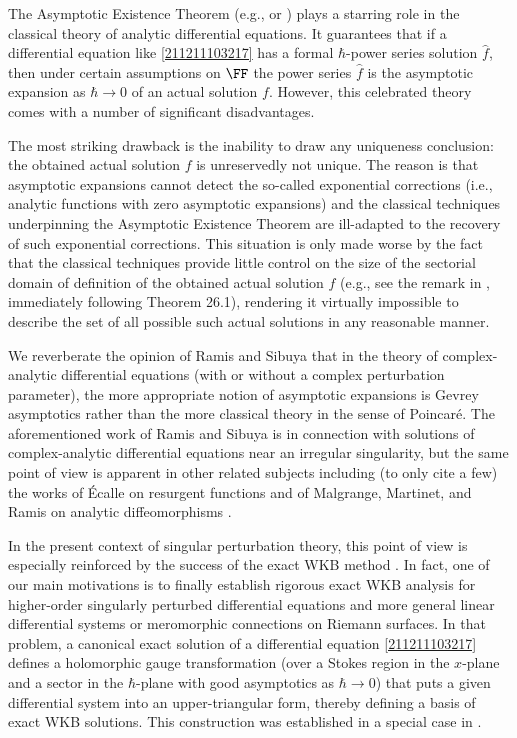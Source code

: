 \documentclass[11pt]{article}
\begin{document}
The Asymptotic Existence Theorem (e.g., \cite[Theorem 26.1]{MR0460820} or \cite[Chapter XII]{MR1697415}) plays a starring role in the classical theory of analytic differential equations.
It guarantees that if a differential equation like \eqref{211211103217} has a formal $\hbar$-power series solution $\hat{f}$, then under certain assumptions on $\FF$ the power series $\hat{f}$ is the asymptotic expansion as $\hbar \to 0$ of an actual solution $f$.
However, this celebrated theory comes with a number of significant disadvantages.

The most striking drawback is the inability to draw any uniqueness conclusion: the obtained actual solution $f$ is unreservedly not unique.
The reason is that asymptotic expansions cannot detect the so-called exponential corrections (i.e., analytic functions with zero asymptotic expansions) and the classical techniques underpinning the Asymptotic Existence Theorem are ill-adapted to the recovery of such exponential corrections.
This situation is only made worse by the fact that the classical techniques provide little control on the size of the sectorial domain of definition of the obtained actual solution $f$ (e.g., see the remark in \cite[p.144]{MR0460820}, immediately following Theorem 26.1), rendering it virtually impossible to describe the set of all possible such actual solutions in any reasonable manner.

\newpage\mbox{}
\vspace{-30pt}

We reverberate the opinion of Ramis and Sibuya \cite{MR991416} that in the theory of complex-analytic differential equations (with or without a complex perturbation parameter), the more appropriate notion of asymptotic expansions is Gevrey asymptotics rather than the more classical theory in the sense of Poincaré.
The aforementioned work of Ramis and Sibuya is in connection with solutions of complex-analytic differential equations near an irregular singularity, but the same point of view is apparent in other related subjects including (to only cite a few) the works of Écalle on resurgent functions \cite{EcalleCinqApplications,zbMATH03971144} and of Malgrange, Martinet, and Ramis on analytic diffeomorphisms \cite{MR689526,MR740592}.

In the present context of singular perturbation theory, this point of view is especially reinforced by the success of the exact WKB method \cite{MR729194, MR819680, MR2074707, MR2182990, MR3003931, MR3280000, MY210623112236}.
In fact, one of our main motivations is to finally establish rigorous exact WKB analysis for higher-order singularly perturbed differential equations and more general linear differential systems or meromorphic connections on Riemann surfaces.
In that problem, a canonical exact solution of a differential equation \eqref{211211103217} defines a holomorphic gauge transformation (over a Stokes region in the $x$-plane and a sector in the $\hbar$-plane with good asymptotics as $\hbar \to 0$) that puts a given differential system into an upper-triangular form, thereby defining a basis of exact WKB solutions.
This construction was established in a special case in \cite{nikolaev2019triangularisation}.
\end{document}

